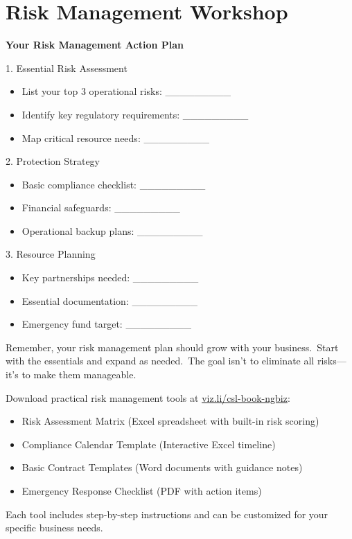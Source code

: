 \section{Risk Management Workshop}\label{sec:risk-workshop}

\begin{workshopbox}
\textbf{Your Risk Management Action Plan}

1. Essential Risk Assessment
\begin{itemize}
    \item List your top 3 operational risks: \_\_\_\_\_\_\_\_\_
    \item Identify key regulatory requirements: \_\_\_\_\_\_\_\_\_
    \item Map critical resource needs: \_\_\_\_\_\_\_\_\_
\end{itemize}

2. Protection Strategy
\begin{itemize}
    \item Basic compliance checklist: \_\_\_\_\_\_\_\_\_
    \item Financial safeguards: \_\_\_\_\_\_\_\_\_
    \item Operational backup plans: \_\_\_\_\_\_\_\_\_
\end{itemize}

3. Resource Planning
\begin{itemize}
    \item Key partnerships needed: \_\_\_\_\_\_\_\_\_
    \item Essential documentation: \_\_\_\_\_\_\_\_\_
    \item Emergency fund target: \_\_\_\_\_\_\_\_\_
\end{itemize}
\end{workshopbox}

\begin{warningbox}
Remember, your risk management plan should grow with your business.\ Start with the essentials and expand as needed.\ The goal isn't to eliminate all risks—it's to make them manageable.
\end{warningbox}

\begin{communitybox}
Download practical risk management tools at \href{https://viz.li/csl-book-ngbiz}{viz.li/csl-book-ngbiz}:
\begin{itemize}
    \item Risk Assessment Matrix (Excel spreadsheet with built-in risk scoring)
    \item Compliance Calendar Template (Interactive Excel timeline)
    \item Basic Contract Templates (Word documents with guidance notes)
    \item Emergency Response Checklist (PDF with action items)
\end{itemize}

Each tool includes step-by-step instructions and can be customized for your specific business needs.
\end{communitybox}

